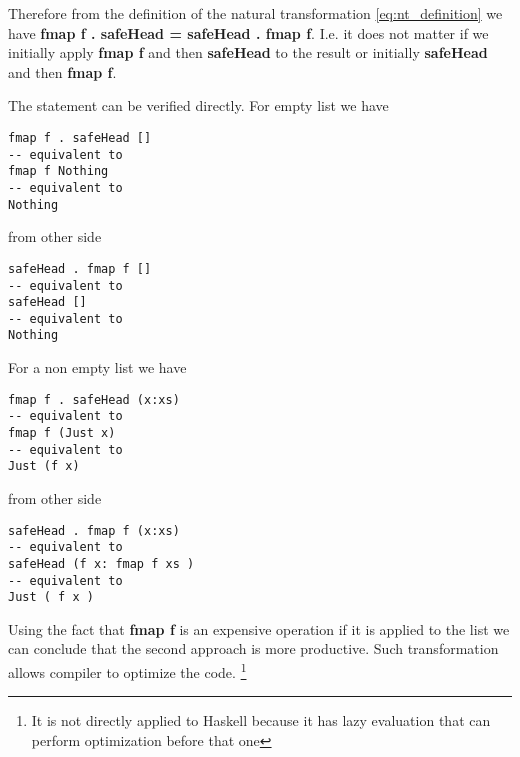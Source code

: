 \begin{example}
Therefore from the definition of the natural transformation
\eqref{eq:nt_definition} we have 
\textbf{fmap f . safeHead = safeHead . fmap f}. I.e. it
does not matter if we initially apply \textbf{fmap f} and
then \textbf{safeHead} to the result or initially
\textbf{safeHead} and then \textbf{fmap f}.

The statement can be verified directly. For empty list we have
\begin{verbatim}
fmap f . safeHead []
-- equivalent to
fmap f Nothing 
-- equivalent to
Nothing
\end{verbatim}
from other side
\begin{verbatim}
safeHead . fmap f []
-- equivalent to
safeHead [] 
-- equivalent to
Nothing
\end{verbatim}

For a non empty list we have
\begin{verbatim}
fmap f . safeHead (x:xs)
-- equivalent to
fmap f (Just x) 
-- equivalent to
Just (f x)
\end{verbatim}
from other side
\begin{verbatim}
safeHead . fmap f (x:xs)
-- equivalent to
safeHead (f x: fmap f xs ) 
-- equivalent to
Just ( f x )
\end{verbatim}

Using the fact that \textbf{fmap f} is an expensive
operation if it is applied to the list we can conclude that the second
approach is more productive. Such transformation allows compiler to
optimize the code.
\footnote{It is not directly applied to Haskell because it has lazy
  evaluation that can perform optimization before that one}
\end{example}
